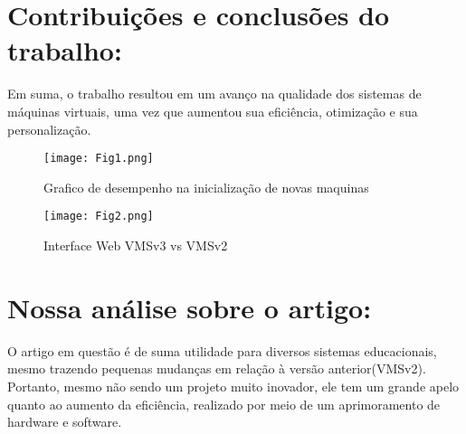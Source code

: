 \documentclass[12pt]{article}
\begin{document}
\section{Contribuições e conclusões do trabalho:}\label{sec:figs}



Em suma, o trabalho resultou em um avanço na qualidade dos sistemas de máquinas virtuais, uma vez que aumentou sua eficiência, otimização e sua personalização.
\\



\begin{figure}[ht]
\centering
\texttt{[image: Fig1.png]}
\caption{Grafico de desempenho na inicialização de novas maquinas \cite{boulic:91}}
\label{fig:exampleFig1}
\end{figure}

\begin{figure}[ht]
\centering
\texttt{[image: Fig2.png]}
\caption{Interface Web VMSv3 vs VMSv2 \cite{boulic:91}}
\label{sec: Fig2}
\end{figure}



\section{Nossa análise sobre o artigo:}

O artigo em questão é de suma utilidade para diversos sistemas educacionais, mesmo trazendo pequenas mudanças em relação à versão anterior(VMSv2). Portanto, mesmo não sendo um projeto muito inovador, ele tem um grande apelo quanto ao aumento da eficiência, realizado por meio de um aprimoramento de hardware e software.
 



\end{document}
